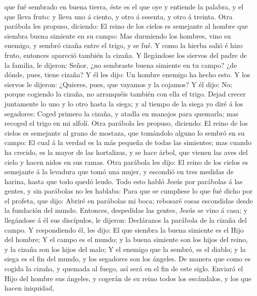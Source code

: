 que fué sembrado en buena tierra, éste es el que oye y entiende la
palabra, y el que lleva fruto: y lleva uno á ciento, y otro á sesenta, y
otro á treinta.  Otra parábola les propuso, diciendo: El
reino de los cielos es semejante al hombre que siembra buena simiente en
su campo:  Mas durmiendo los hombres, vino su enemigo, y
sembró cizaña entre el trigo, y se fué.  Y como la hierba
salió é hizo fruto, entonces apareció también la cizaña.  Y
llegándose los siervos del padre de la familia, le dijeron: Señor, ¿no
sembraste buena simiente en tu campo? ¿de dónde, pues, tiene cizaña?
 Y él les dijo: Un hombre enemigo ha hecho esto. Y los
siervos le dijeron: ¿Quieres, pues, que vayamos y la cojamos?
 Y él dijo: No; porque cogiendo la cizaña, no arranquéis
también con ella el trigo.  Dejad crecer juntamente lo uno
y lo otro hasta la siega; y al tiempo de la siega yo diré á los
segadores: Coged primero la cizaña, y atadla en manojos para quemarla;
mas recoged el trigo en mi alfolí.  Otra parábola les
propuso, diciendo: El reino de los cielos es semejante al grano de
mostaza, que tomándolo alguno lo sembró en su campo:  El
cual á la verdad es la más pequeña de todas las simientes; mas cuando ha
crecido, es la mayor de las hortalizas, y se hace árbol, que vienen las
aves del cielo y hacen nidos en sus ramas.  Otra parábola
les dijo: El reino de los cielos es semejante á la levadura que tomó una
mujer, y escondió en tres medidas de harina, hasta que todo quedó leudo.
 Todo esto habló Jesús por parábolas á las gentes, y sin
parábolas no les hablaba:  Para que se cumpliese lo que fué
dicho por el profeta, que dijo: Abriré en parábolas mi boca; rebosaré
cosas escondidas desde la fundación del mundo.  Entonces,
despedidas las gentes, Jesús se vino á casa; y llegándose á él sus
discípulos, le dijeron: Decláranos la parábola de la cizaña del campo.
 Y respondiendo él, les dijo: El que siembra la buena
simiente es el Hijo del hombre;  Y el campo es el mundo; y
la buena simiente son los hijos del reino, y la cizaña son los hijos del
malo;  Y el enemigo que la sembró, es el diablo; y la siega
es el fin del mundo, y los segadores son los ángeles.  De
manera que como es cogida la cizaña, y quemada al fuego, así será en el
fin de este siglo.  Enviará el Hijo del hombre sus ángeles,
y cogerán de su reino todos los escándalos, y los que hacen iniquidad,
